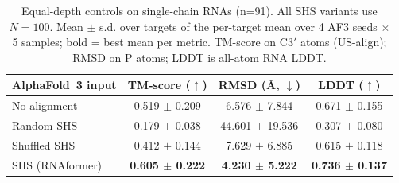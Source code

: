 \begin{table}[htbp]
\centering
\caption{Equal-depth controls on single-chain RNAs (n=91). All SHS variants use $N{=}100$. Mean $\pm$ s.d. over targets of the per-target mean over 4 AF3 seeds $\times$ 5 samples; bold = best mean per metric. TM-score on C3$'$ atoms (US-align); RMSD on P atoms; LDDT is all-atom RNA LDDT.}
\label{tab:rna_single_chain_controls}
\begin{tabular}{lccc}
\toprule
AlphaFold~3 input & TM-score ($\uparrow$) & RMSD (\AA, $\downarrow$) & LDDT ($\uparrow$) \\
\midrule
No alignment & 0.519 $\pm$ 0.209 & 6.576 $\pm$ 7.844 & 0.671 $\pm$ 0.155 \\
Random SHS & 0.179 $\pm$ 0.038 & 44.601 $\pm$ 19.536 & 0.307 $\pm$ 0.080 \\
Shuffled SHS & 0.412 $\pm$ 0.144 & 7.629 $\pm$ 6.885 & 0.615 $\pm$ 0.118 \\
SHS (RNAformer) & \textbf{0.605 $\pm$ 0.222} & \textbf{4.230 $\pm$ 5.222} & \textbf{0.736 $\pm$ 0.137} \\
\bottomrule
\end{tabular}
\end{table}
